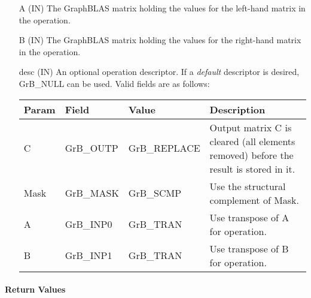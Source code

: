 \begin{itemize}[leftmargin=1.1in]
    \item[{\sf A}]     ({\sf IN}) The GraphBLAS matrix holding the values for
    the left-hand matrix in the operation.
    
    \item[{\sf B}]     ({\sf IN}) The GraphBLAS matrix holding the values for
    the right-hand matrix in the operation.
    
    \item[{\sf desc}]  ({\sf IN}) An optional operation descriptor.  If a \emph{default}
    descriptor is desired, {\sf GrB\_NULL} can be used.  Valid fields are
    as follows: \\
    
    \begin{tabular}{lllp{2.5in}}
        Param & Field  & Value & Description \\
        \hline
        {\sf C}    & {\sf GrB\_OUTP} & {\sf GrB\_REPLACE} & Output matrix {\sf C} is cleared (all elements removed) before the result is stored in it.  \\
        {\sf Mask} & {\sf GrB\_MASK} & {\sf GrB\_SCMP}   & Use the structural complement of {\sf Mask}. \\
        {\sf A}    & {\sf GrB\_INP0} & {\sf GrB\_TRAN}   & Use transpose of {\sf A} for operation. \\
        {\sf B}    & {\sf GrB\_INP1} & {\sf GrB\_TRAN}   & Use transpose of {\sf B} for operation. \\
    \end{tabular}
\end{itemize}

\paragraph{Return Values}

